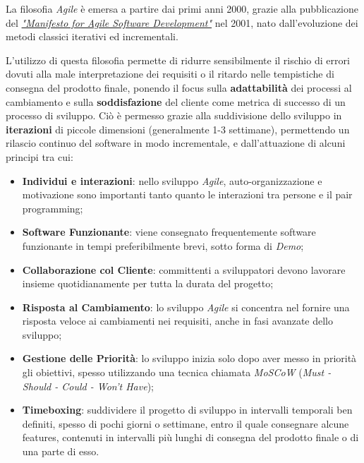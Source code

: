 \documentclass[a4paper,12pt]{report}
\begin{document}
				La filosofia \emph{Agile} è emersa a partire dai primi anni 2000, grazie alla pubblicazione del \href{https://agilemanifesto.org/iso/it/principles.html}{\emph{"Manifesto for Agile Software Development"}} nel 2001, nato dall'evoluzione dei metodi classici iterativi ed incrementali.
				
				L'utilizzo di questa filosofia permette di ridurre sensibilmente il rischio di errori dovuti alla male interpretazione dei requisiti o il ritardo nelle tempistiche di consegna del prodotto finale, ponendo il focus sulla \textbf{adattabilità} dei processi al cambiamento e sulla \textbf{soddisfazione} del cliente come metrica di successo di un processo di sviluppo.
				Ciò è permesso grazie alla suddivisione dello sviluppo in \textbf{iterazioni} di piccole dimensioni (generalmente 1-3 settimane), permettendo un rilascio continuo del software in modo incrementale, e dall'attuazione di alcuni principi tra cui:
				
				\begin{itemize}
					\item \textbf{Individui e interazioni}: nello sviluppo \emph{Agile}, auto-organizzazione e motivazione sono importanti tanto quanto le interazioni tra persone e il pair programming;
					\item \textbf{Software Funzionante}: viene consegnato frequentemente software funzionante in tempi preferibilmente brevi, sotto forma di \emph{Demo};
					\item \textbf{Collaborazione col Cliente}: committenti a sviluppatori devono lavorare insieme quotidianamente per tutta la durata del progetto;
					\item \textbf{Risposta al Cambiamento}: lo sviluppo \emph{Agile} si concentra nel fornire una risposta veloce ai cambiamenti nei requisiti, anche in fasi avanzate dello sviluppo;
					\item \textbf{Gestione delle Priorità}: lo sviluppo inizia solo dopo aver messo in priorità gli obiettivi, spesso utilizzando una tecnica chiamata \emph{MoSCoW} (\emph{Must - Should - Could - Won't Have});
					\item \textbf{Timeboxing}: suddividere il progetto di sviluppo in intervalli temporali ben definiti, spesso di pochi giorni o settimane, entro il quale consegnare alcune features, contenuti in intervalli più lunghi di consegna del prodotto finale o di una parte di esso.
				\end{itemize}
			
\end{document}
